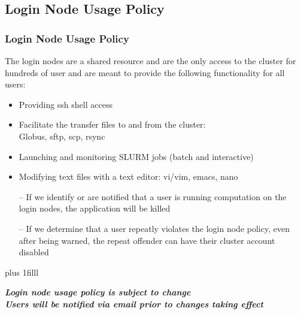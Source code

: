 \documentclass[t,hyperref={pdfpagelabels=false}]{beamer}
\newcommand{\btVFill}{\vskip0pt plus 1filll}
\begin{document}
\subsection{Login Node Usage Policy}
\begin{frame}
\frametitle{Login Node Usage Policy}\footnotesize
The login nodes are a shared resource and are the only access to the cluster for hundreds of user and are meant to provide the following functionality for all users: 
\begin{itemize}
\item Providing ssh shell access 
\item Facilitate the transfer files to and from the cluster:\\Globus, sftp, scp, rsync
\item Launching and monitoring SLURM jobs (batch and interactive)
\item Modifying text files with a text editor: vi/vim, emacs, nano
\end{itemize}
\bigskip
\begin{itemize}
\item[--] If we identify or are notified that a user is running computation on the login nodes, the application will be killed
\item[--] If we determine that a user repeatly violates the login node policy, even after being warned, the repeat offender can have their cluster account disabled
\end{itemize}
\btVFill
\begin{center}
\footnotesize \textbf{\emph{Login node usage policy is subject to change~\\Users will be notified via email prior to changes taking effect}}
\end{center}
\end{frame}
\end{document}
